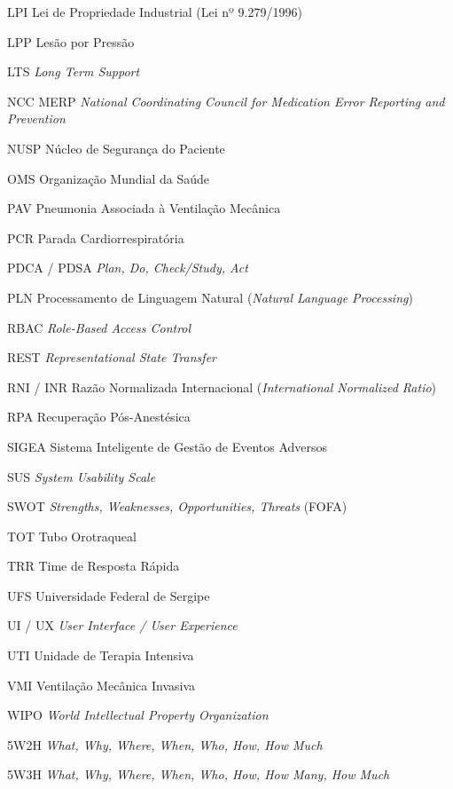 \begin{siglas}
  \item[LPI] Lei de Propriedade Industrial (Lei nº 9.279/1996)
  \item[LPP] Lesão por Pressão
  \item[LTS] \textit{Long Term Support}
  \item[NCC MERP] \textit{National Coordinating Council for Medication Error Reporting and Prevention}
  \item[NUSP] Núcleo de Segurança do Paciente
  \item[OMS] Organização Mundial da Saúde
  \item[PAV] Pneumonia Associada à Ventilação Mecânica
  \item[PCR] Parada Cardiorrespiratória
  \item[PDCA / PDSA] \textit{Plan, Do, Check/Study, Act}
  \item[PLN] Processamento de Linguagem Natural (\textit{Natural Language Processing})
  \item[RBAC] \textit{Role-Based Access Control}
  \item[REST] \textit{Representational State Transfer}
  \item[RNI / INR] Razão Normalizada Internacional (\textit{International Normalized Ratio})
  \item[RPA] Recuperação Pós-Anestésica
  \item[SIGEA] Sistema Inteligente de Gestão de Eventos Adversos
  \item[SUS] \textit{System Usability Scale}
  \item[SWOT] \textit{Strengths, Weaknesses, Opportunities, Threats} (FOFA)
  \item[TOT] Tubo Orotraqueal
  \item[TRR] Time de Resposta Rápida
  \item[UFS] Universidade Federal de Sergipe
  \item[UI / UX] \textit{User Interface / User Experience}
  \item[UTI] Unidade de Terapia Intensiva
  \item[VMI] Ventilação Mecânica Invasiva
  \item[WIPO] \textit{World Intellectual Property Organization}
  \item[5W2H] \textit{What, Why, Where, When, Who, How, How Much}
  \item[5W3H] \textit{What, Why, Where, When, Who, How, How Many, How Much}
\end{siglas}
